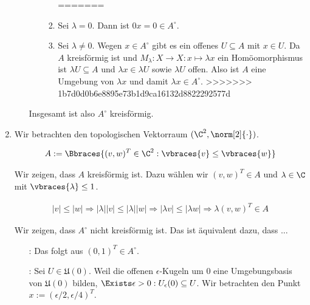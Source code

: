 \begin{solution}
\begin{enumerate}[label = (\roman*)]
\begin{enumerate}
\begin{enumerate}[label = Fall \arabic*:]
\begin{enumerate}[label = Fall 2.\arabic*:]
=======
        \item Sei $\lambda = 0$. Dann ist $0x = 0 \in A^\circ$.
        \item Sei $\lambda \neq 0$. Wegen $x \in A^\circ$ gibt es ein offenes $U \subseteq A$ mit $x \in U$. Da $A$ kreisförmig ist und $M_\lambda: X \to X : x \mapsto \lambda x$ ein Homöomorphismus ist $\lambda U \subseteq A$ und $\lambda x \in \lambda U$ sowie $\lambda U$ offen. Also ist $A$ eine Umgebung von $\lambda x$ und damit $\lambda x \in A^\circ$.
>>>>>>> 1b7d0d0b6e8895e73b1d9ca16132d8822292577d
      \end{enumerate}

    \end{enumerate}

    Insgesamt ist also $A^\circ$ kreisförmig.

  \end{enumerate}

  \item
  Wir betrachten den topologischen Vektorraum $(\C^2, \norm[2]{\cdot})$.

  \begin{align*}
    A :=
    \Bbraces
    {
      (v, w)^T \in \C^2:
      \vbraces{v} \leq \vbraces{w}
    }
  \end{align*}

  Wir zeigen, dass $A$ kreisförmig ist.
  Dazu wählen wir $(v, w)^T \in A$ und $\lambda \in \C$ mit $\vbraces{\lambda} \leq 1$.

  \begin{align*}
    |v| \leq |w|
    \Rightarrow
    |\lambda|
    |v| \leq |\lambda| |w|
    \Rightarrow
    |\lambda v| \leq |\lambda w|
    \Rightarrow
    \lambda (v, w)^T \in A
  \end{align*}

  Wir zeigen, dass $A^\circ$ nicht kreisförmig ist.
  Das ist äquivalent dazu, dass ...

  \begin{itemize}[label = {}]

    \item
    [\Quote{$A^\circ \neq \emptyset$}:]
    Das folgt aus $(0, 1)^T \in A^\circ$.

    \item
    [\Quote{$0 \notin A^\circ$}:]
    Sei $U \in \mathfrak{U}(0)$.
    Weil die offenen $\epsilon$-Kugeln um $0$ eine Umgebungsbasis von $\mathfrak{U}(0)$ bilden, $\Exists \epsilon > 0: U_\epsilon(0) \subseteq U$.
    Wir betrachten den Punkt $x := (\epsilon / 2, \epsilon / 4)^T$.


\end{itemize}
\end{enumerate}
\end{solution}
